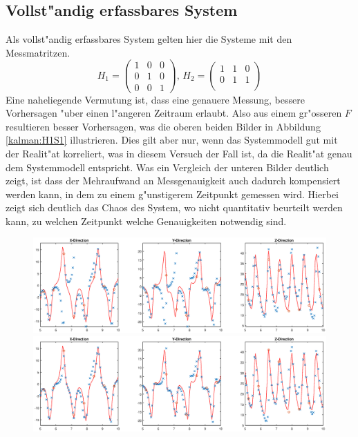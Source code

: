 \begin{refsection}
\subsection{Vollst"andig erfassbares System}
Als vollst"andig erfassbares System gelten hier die Systeme mit den Messmatritzen.
\[H_{1}=\begin{pmatrix}
1 & 0 & 0 \\ 
0 & 1 & 0 \\ 
0 & 0 & 1
\end{pmatrix} 
\text{, }
H_{2}=\begin{pmatrix}
1 & 1 & 0 \\ 
0 & 1 & 1 \\ 
\end{pmatrix}\]
Eine naheliegende Vermutung ist, dass eine genauere Messung, bessere Vorhersagen "uber einen l"angeren Zeitraum erlaubt. Also aus einem gr"osseren $F$ resultieren besser Vorhersagen, was die oberen beiden Bilder in Abbildung \ref{kalman:H1S1} illustrieren. Dies gilt aber nur, wenn das Systemmodell gut mit der Realit"at korreliert, was in diesem Versuch der Fall ist, da die Realit"at genau dem Systemmodell entspricht.
Was ein Vergleich der unteren Bilder deutlich zeigt, ist dass der Mehraufwand an Messgenauigkeit auch dadurch kompensiert werden kann, in dem zu einem g"unstigerem Zeitpunkt gemessen wird. Hierbei zeigt sich deutlich das Chaos des System, wo nicht quantitativ beurteilt werden kann, zu welchen Zeitpunkt welche Genauigkeiten notwendig sind.
\begin{figure}
\centering
\includegraphics[width=\hsize]{kalman/figures/H1R10S1.eps}
\includegraphics[width=\hsize]{kalman/figures/H1R20S1.eps}

\end{figure}
\end{refsection}
